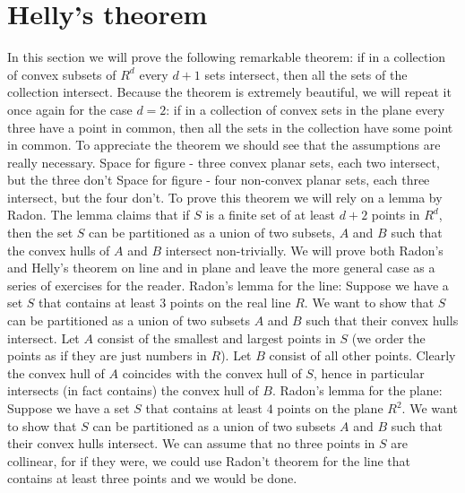 \section{Helly's theorem}
In this section we will prove the following remarkable theorem: if in a collection of convex subsets of $R^d$ every $d+1$ sets intersect, then all the sets of the collection intersect. Because the theorem is extremely beautiful, we will repeat it once again for the case $d=2$: if in a collection of convex sets in the plane every three have a point in common, then all the sets in the collection have some point in common.
To appreciate the theorem we should see that the assumptions are really necessary.
Space for figure - three convex planar sets, each two intersect, but the three don't
Space for figure - four non-convex planar sets, each three intersect, but the four don't.
To prove this theorem we will rely on a lemma by Radon.
The lemma claims that if $S$ is a finite set of at least $d+2$ points in $R^d$, then the set $S$ can be partitioned as a union of two subsets, $A$ and $B$ such that the convex hulls of $A$ and $B$ intersect non-trivially.
We will prove both Radon's and Helly's theorem on line and in plane and leave the more general case as a series of exercises for the reader.
Radon's lemma for the line: Suppose we have a set $S$ that contains at least $3$ points on the real line $R$. We want to show that $S$ can be partitioned as a union of two subsets $A$ and $B$ such that their convex hulls intersect. Let $A$ consist of the smallest and largest points in $S$ (we order the points as if they are just numbers in $R$). Let $B$ consist of all other points. Clearly the convex hull of $A$ coincides with the convex hull of $S$, hence in particular intersects (in fact contains) the convex hull of $B$.
Radon's lemma for the plane: Suppose we have a set $S$ that contains at least $4$ points on the plane $R^2$. We want to show that $S$ can be partitioned as a union of two subsets $A$ and $B$ such that their convex hulls intersect. We can assume that no three points in $S$ are collinear, for if they were, we could use Radon't theorem for the line that contains at least three points and we would be done.
